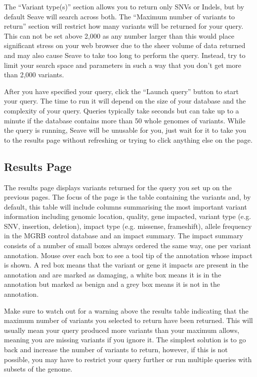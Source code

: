 \documentclass[11pt, a4paper]{article}
\begin{document}
The ``Variant type(s)'' section allows you to return only SNVs or Indels, but by default Seave will search across both. The ``Maximum number of variants to return'' section will restrict how many variants will be returned for your query. This can not be set above 2,000 as any number larger than this would place significant stress on your web browser due to the sheer volume of data returned and may also cause Seave to take too long to perform the query. Instead, try to limit your search space and parameters in such a way that you don't get more than 2,000 variants.

After you have specified your query, click the ``Launch query'' button to start your query. The time to run it will depend on the size of your database and the complexity of your query. Queries typically take seconds but can take up to a minute if the database contains more than 50 whole genomes of variants. While the query is running, Seave will be unusable for you, just wait for it to take you to the results page without refreshing or trying to click anything else on the page.

\subsection{Results Page}

The results page displays variants returned for the query you set up on the previous pages. The focus of the page is the table containing the variants and, by default, this table will include columns summarising the most important variant information including genomic location, quality, gene impacted, variant type (e.g. SNV, insertion, deletion), impact type (e.g. missense, frameshift), allele frequency in the MGRB control database and an impact summary. The impact summary consists of a number of small boxes always ordered the same way, one per variant annotation. Mouse over each box to see a tool tip of the annotation whose impact is shown. A red box means that the variant or gene it impacts are present in the annotation and are marked as damaging, a white box means it is in the annotation but marked as benign and a grey box means it is not in the annotation.

Make sure to watch out for a warning above the results table indicating that the maximum number of variants you selected to return have been returned. This will usually mean your query produced more variants than your maximum allows, meaning you are missing variants if you ignore it. The simplest solution is to go back and increase the number of variants to return, however, if this is not possible, you may have to restrict your query further or run multiple queries with subsets of the genome.
\end{document}
